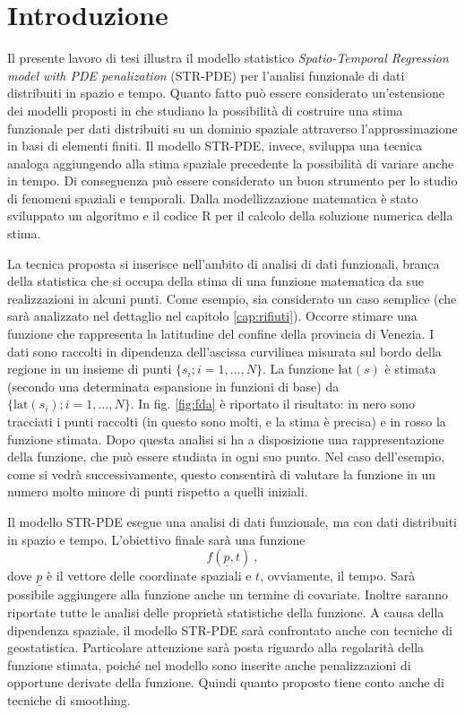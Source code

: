 \documentclass[a4paper,11pt,twoside,openright]{book}							%
\begin{document}
\chapter*{Introduzione}
\label{Cap:intro}
\thispagestyle{empty}

Il presente lavoro di tesi illustra il modello statistico \textit{Spatio-Temporal Regression model with PDE penalization} (STR-PDE) per l'analisi funzionale di dati distribuiti in spazio e tempo. Quanto fatto può essere considerato un'estensione dei modelli proposti in \cite{art:sangalli} che studiano la possibilità di costruire una stima funzionale per dati distribuiti su un dominio spaziale attraverso l'approssimazione in basi di elementi finiti. Il modello STR-PDE, invece, sviluppa una tecnica analoga aggiungendo alla stima spaziale precedente la possibilità di variare anche in tempo. Di conseguenza può essere considerato un buon strumento per lo studio di fenomeni spaziali e temporali. Dalla modellizzazione matematica è stato sviluppato un algoritmo e il codice R per il calcolo della soluzione numerica della stima.

La tecnica proposta si inserisce nell'ambito di analisi di dati funzionali, branca della statistica che si occupa della stima di una funzione matematica da sue realizzazioni in alcuni punti. Come esempio, sia considerato un caso semplice (che sarà analizzato nel dettaglio nel capitolo \ref{cap:rifiuti}). Occorre stimare una funzione che rappresenta la latitudine del confine della provincia di Venezia. I dati sono raccolti in dipendenza dell'ascissa curvilinea misurata sul bordo della regione in un insieme di punti $\{s_i ; i=1, \ldots , N\}$. La funzione $\mathrm{lat}(s)$ è stimata (secondo una determinata espansione in funzioni di base) da $\{\mathrm{lat}(s_i) ; i=1, \ldots , N\}$. In fig. \ref{fig:fda} è riportato il risultato: in nero sono tracciati i punti raccolti (in questo sono molti, e la stima è precisa) e in rosso la funzione stimata. Dopo questa analisi si ha a disposizione una rappresentazione della funzione, che può essere studiata in ogni suo punto. Nel caso dell'esempio, come si vedrà successivamente, questo consentirà di valutare la funzione in un numero molto minore di punti rispetto a quelli iniziali.

Il modello STR-PDE esegue una analisi di dati funzionale, ma con dati distribuiti in spazio e tempo. L'obiettivo finale sarà una funzione
$$
f(\underline{p},t) \ , 
$$
dove $\underline{p}$ è il vettore delle coordinate spaziali e $t$, ovviamente, il tempo. Sarà possibile aggiungere alla funzione anche un termine di covariate. Inoltre saranno riportate tutte le analisi delle proprietà statistiche della funzione. A causa della dipendenza spaziale, il modello STR-PDE sarà confrontato anche con tecniche di geostatistica. Particolare attenzione sarà posta riguardo alla regolarità della funzione stimata, poiché nel modello sono inserite anche penalizzazioni di opportune derivate della funzione. Quindi quanto proposto tiene conto anche di tecniche di smoothing.
\end{document}
